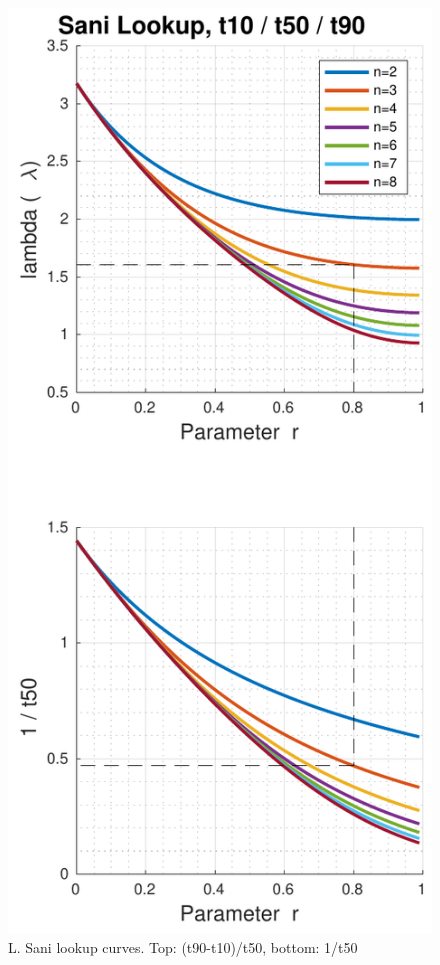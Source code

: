 \begin{figure}[t]
    \includegraphics[width=\linewidth]{images/sani_curves_t10_t50_t90}
    \caption{L. Sani lookup curves. Top: (t90-t10)/t50, bottom: 1/t50}
    \label{fig:sani_t3}
\end{figure}

